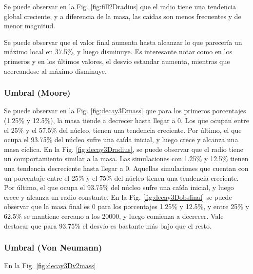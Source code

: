 Se puede observar en la Fig. \ref{fig:fill2Dradius} que el radio tiene una tendencia global creciente, y a diferencia de la masa, las caídas son menos frecuentes y de menor magnitud.

Se puede observar que el valor final aumenta hasta alcanzar lo que parecería un máximo local en 37.5\%, y luego disminuye.
Es interesante notar como en los primeros y en los últimos valores, el desvío estandar aumenta, mientras que acercandose al máximo disminuye.


\subsubsection{Umbral (Moore)}
Se puede observar en la Fig. \ref{fig:decay3Dmass} que para los primeros porcentajes (1.25\% y 12.5\%), la masa tiende a decrecer hasta llegar a $0$.
Los que ocupan entre el 25\% y el 57.5\% del núcleo, tienen una tendencia creciente.
Por último, el que ocupa el 93.75\% del núcleo sufre una caída inicial, y luego crece y alcanza una masa cíclica.
En la Fig. \ref{fig:decay3Dradius}, se puede observar que el radio tiene un comportamiento similar a la masa.
Las simulaciones con 1.25\% y 12.5\% tienen una tendencia decreciente hasta llegar a $0$.
Aquellas simulaciones que cuentan con un porcentaje entre el 25\% y el 75\% del núcleo tienen una tendencia creciente.
Por último, el que ocupa el 93.75\% del núcleo sufre una caída inicial, y luego crece y alcanza un radio constante.
En la Fig. \ref{fig:decay3Dobsfinal} se puede observar que la masa final es 0 para los porcentajes 1.25\% y 12.5\%, y entre 25\% y 62.5\% se mantiene cercano a los 20000, y luego comienza a decrecer. Vale destacar que para 93.75\% el desvío es bastante más bajo que el resto.

\subsubsection{Umbral (Von Neumann)}
En la Fig. \ref{fig:decay3Dv2mass}
